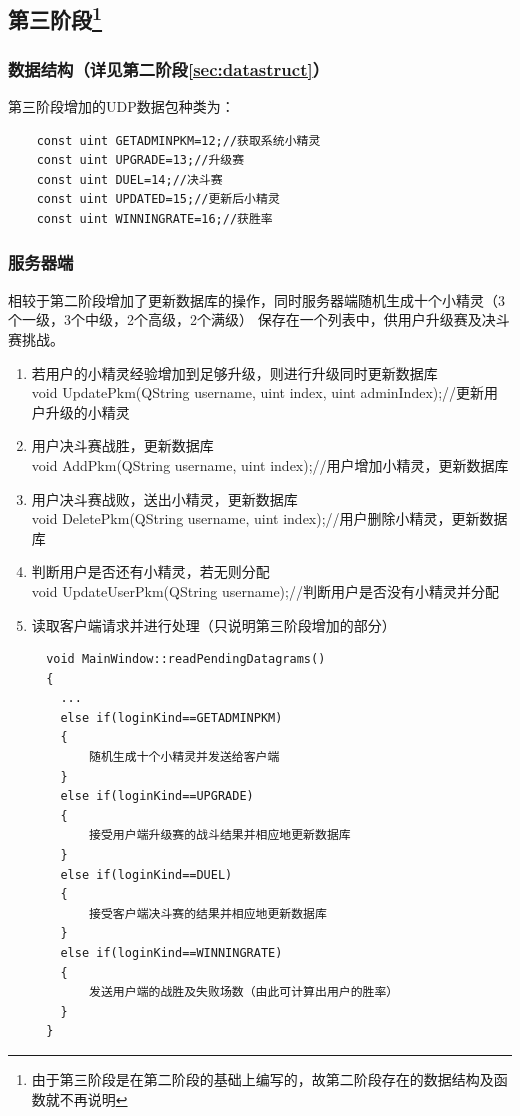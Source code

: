 \documentclass{ctexart}
\begin{document}
\subsection[第三阶段]{第三阶段\footnote{由于第三阶段是在第二阶段的基础上编写的，故第二阶段存在的数据结构及函数就不再说明}}
\subsubsection{数据结构（详见第二阶段\ref{sec:datastruct}）}
第三阶段增加的UDP数据包种类为：
\lstset{language=C++}
\begin{lstlisting}
    const uint GETADMINPKM=12;//获取系统小精灵
    const uint UPGRADE=13;//升级赛
    const uint DUEL=14;//决斗赛
    const uint UPDATED=15;//更新后小精灵
    const uint WINNINGRATE=16;//获胜率
\end{lstlisting}
\subsubsection{服务器端}
相较于第二阶段增加了更新数据库的操作，同时服务器端随机生成十个小精灵（3个一级，3个中级，2个高级，2个满级）
保存在一个列表中，供用户升级赛及决斗赛挑战。
\begin{enumerate}
  \item 若用户的小精灵经验增加到足够升级，则进行升级同时更新数据库\\
    void UpdatePkm(QString username, uint index, uint adminIndex);//更新用户升级的小精灵
  \item 用户决斗赛战胜，更新数据库\\
    void AddPkm(QString username, uint index);//用户增加小精灵，更新数据库
  \item 用户决斗赛战败，送出小精灵，更新数据库\\
    void DeletePkm(QString username, uint index);//用户删除小精灵，更新数据库
  \item 判断用户是否还有小精灵，若无则分配\\
    void UpdateUserPkm(QString username);//判断用户是否没有小精灵并分配
  \item 读取客户端请求并进行处理（只说明第三阶段增加的部分）\\
  \lstset{language=C++}
  \begin{lstlisting}
  void MainWindow::readPendingDatagrams()
  {
    ...
    else if(loginKind==GETADMINPKM)
    {
        随机生成十个小精灵并发送给客户端
    }
    else if(loginKind==UPGRADE)
    {
        接受用户端升级赛的战斗结果并相应地更新数据库
    }
    else if(loginKind==DUEL)
    {
        接受客户端决斗赛的结果并相应地更新数据库
    }
    else if(loginKind==WINNINGRATE)
    {
        发送用户端的战胜及失败场数（由此可计算出用户的胜率）
    }
  }
  \end{lstlisting}
\end{enumerate}
\end{document}
